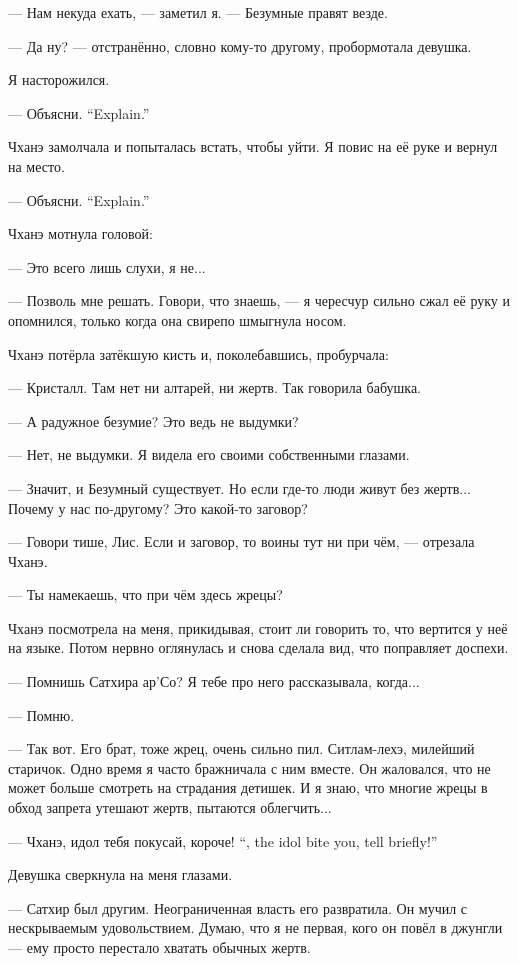 --- Нам некуда ехать, --- заметил я.
--- Безумные правят везде.

--- Да ну? --- отстранённо, словно кому-то другому, пробормотала девушка.

Я насторожился.

{--- Объясни.}
{``Explain.''}

Чханэ замолчала и попыталась встать, чтобы уйти.
Я повис на её руке и вернул на место.

{--- Объясни.}
{``Explain.''}

Чханэ мотнула головой:

--- Это всего лишь слухи, я не...

--- Позволь мне решать.
Говори, что знаешь, --- я чересчур сильно сжал её руку и опомнился, только когда она свирепо шмыгнула носом.

Чханэ потёрла затёкшую кисть и, поколебавшись, пробурчала:

--- Кристалл.
Там нет ни алтарей, ни жертв.
Так говорила бабушка.

--- А радужное безумие?
Это ведь не выдумки?

--- Нет, не выдумки.
Я видела его своими собственными глазами.

--- Значит, и Безумный существует.
Но если где-то люди живут без жертв...
Почему у нас по-другому?
Это какой-то заговор?

--- Говори тише, Лис.
Если и заговор, то воины тут ни при чём, --- отрезала Чханэ.

--- Ты намекаешь, что при чём здесь жрецы?

Чханэ посмотрела на меня, прикидывая, стоит ли говорить то, что вертится у неё на языке.
Потом нервно оглянулась и снова сделала вид, что поправляет доспехи.

--- Помнишь Сатхира ар’Со?
Я тебе про него рассказывала, когда...

--- Помню.

--- Так вот.
Его брат, тоже жрец, очень сильно пил.
Ситлам-лехэ, милейший старичок.
Одно время я часто бражничала с ним вместе.
Он жаловался, что не может больше смотреть на страдания детишек.
И я знаю, что многие жрецы в обход запрета утешают жертв, пытаются облегчить...

{--- Чханэ, идол тебя покусай, короче!}
{``\Chhanei, the idol bite you, tell briefly!''}

Девушка сверкнула на меня глазами.

--- Сатхир был другим.
Неограниченная власть его развратила.
Он мучил с нескрываемым удовольствием.
Думаю, что я не первая, кого он повёл в джунгли --- ему просто перестало хватать обычных жертв.

